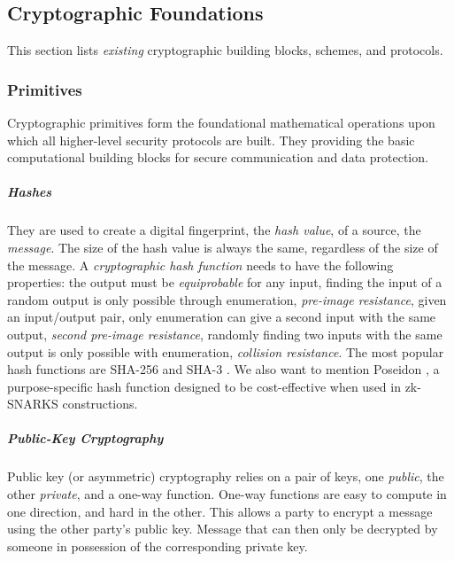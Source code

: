 \subsection{Cryptographic Foundations}
\label{subsub:cryptography}

This section lists \emph{existing} cryptographic building blocks, schemes, and protocols.


\subsubsection{Primitives} Cryptographic primitives form the foundational mathematical operations upon which all higher-level security protocols are built.
They providing the basic computational building blocks for secure communication and data protection.

\subparagraph{Hashes} They are used to create a digital fingerprint, the \emph{hash value}, of a source, the \emph{message}.
The size of the hash value is always the same, regardless of the size of the message.
A \emph{cryptographic hash function} needs to have the following properties:
the output must be \emph{equiprobable} for any input, finding the input of a random output is only possible through enumeration, \emph{pre-image resistance}, given an input/output pair, only enumeration can give a second input with the same output, \emph{second pre-image resistance}, randomly finding two inputs with the same output is only possible with enumeration, \emph{collision resistance}.
The most popular hash functions are SHA-256 \cite{FIPS180-4} and SHA-3 \cite{FIPS202}.
We also want to mention Poseidon \cite{GKRRS21}, a purpose-specific hash function designed to be cost-effective when used in zk-SNARKS constructions.

\subparagraph{Public-Key Cryptography} 
\label{sp:public-key-cryptography}
Public key (or asymmetric) cryptography relies on a pair of keys, one \emph{public}, the other \emph{private}, and a one-way function. 
One-way functions are easy to compute in one direction, and hard in the other. 
This allows a party to encrypt a message using the other party's public key. 
Message that can then only be decrypted by someone in possession of the corresponding private key.

